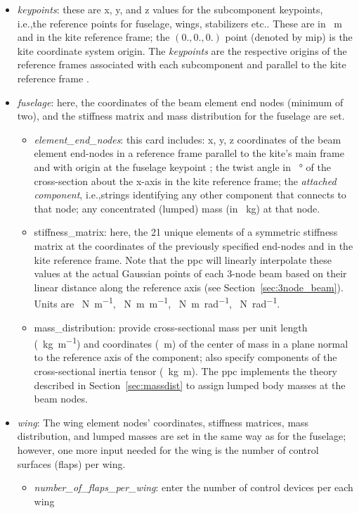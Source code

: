 \documentclass[report]{nrel}
\def\ie{i.e., }
\def\ie{i.e.,}
\begin{document}
\begin{itemize}
\begin{itemize}
\begin{itemize}
\begin{itemize}
				\end{itemize}
			\end{itemize}
%		
	\end{itemize} %
%
	\item \emph{keypoints}: these are x, y, and z values for the subcomponent keypoints, \ie the reference points for fuselage, wings, stabilizers etc.. These are in \SI{}{\m} and in the kite reference frame; the $(0.,0.,0.)$ point (denoted by \gls{mip}) is the kite coordinate system origin. The \emph{keypoints} are the respective origins of the reference frames associated with each subcomponent and parallel to the kite reference frame \cite{jonkman2018}.
	\item \emph{fuselage}: here, the coordinates of the beam element end nodes (minimum of two), and the stiffness matrix and mass distribution for the fuselage are set.
	\begin{itemize}
		\item \emph{element\_end\_nodes}: this card includes: x, y, z coordinates of the beam element end-nodes in a reference frame parallel to the kite's main frame and with origin at the fuselage keypoint ; the twist angle in \SI{}{\degree} of the cross-section about the x-axis in the kite reference frame; the \emph{attached component}, \ie strings identifying any other component that connects to that node; any concentrated (lumped) mass (in \SI{}{\kg}) at that node.
		\item {stiffness\_matrix}: here, the 21 unique elements of a symmetric stiffness matrix at the coordinates of the previously specified end-nodes and in the kite reference frame. Note that the \gls{ppc} will linearly interpolate these values at the actual Gaussian points of each 3-node beam based on their linear distance along the reference axis (see Section~\ref{sec:3node_beam}).  Units are \SI{}{\N\per\m}, \SI{}{\N\m\per\m}, \SI{}{\N\m\per\radian}, \SI{}{\N\per\radian}.
		\item {mass\_distribution}: provide cross-sectional mass per unit length (\SI{}{\kg\per\m}) and coordinates (\SI{}{\m}) of the center of mass in a plane normal to the reference axis of the component; also specify components of the cross-sectional inertia tensor (\SI{}{\kg\m}). The \gls{ppc} implements the theory described in Section~\ref{sec:massdist} to assign lumped body masses at the beam nodes.
		
	\end{itemize}

%
	\item \emph{wing}: The wing element nodes' coordinates, stiffness matrices, mass distribution, and lumped masses are set in the same way as for the fuselage; however, one more input  needed for the wing is the number of control surfaces (flaps) per wing.
		\begin{itemize}
			\item \emph{number\_of\_flaps\_per\_wing}: enter the number of control devices per each wing
	

\end{itemize}
\end{itemize}
\end{document}
